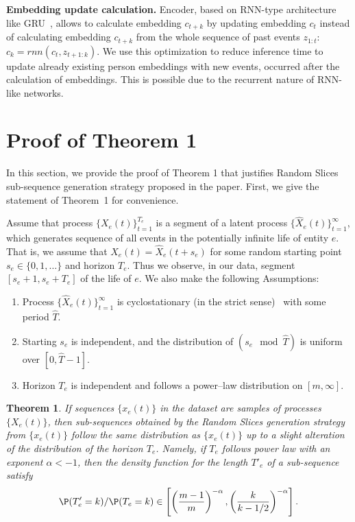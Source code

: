 \documentclass{article}
\newtheorem{thm}{Theorem}
\begin{document}
\textbf{Embedding update calculation.} Encoder, based on RNN-type architecture like GRU~\citep{Cho2014LearningPR}, allows to calculate embedding $c_{t+k}$ by updating embedding $c_t$ instead of  calculating embedding $c_{t+k}$ from the whole sequence of past events $z_{1:t}$: $c_k = rnn(c_t, z_{t+1:k})$. We use this optimization to reduce inference time to update already existing person embeddings with new events, occurred after the calculation of embeddings. This is possible due to the recurrent nature of RNN-like networks.

\section{Proof of Theorem 1} \label{app-sec-proof}

In this section, we provide the proof of Theorem 1 that justifies Random Slices sub-sequence generation strategy proposed in the paper. First, we give the statement of Theorem~1 for convenience.

Assume that process $\{X_e(t)\}_{t=1}^{T_e}$ is a segment of a latent process $\{\widehat{X}_e(t)\}_{t=1}^{\infty}$, which generates sequence of all events in the potentially infinite life of entity $e$. That is, we assume that $X_e(t)=\widehat{X}_e(t+s_e)$ for some random starting point $s_e\in \{0,1,\ldots\}$ and horizon $T_e$. Thus we observe, in our data, segment $[s_e+1,s_e+T_e]$ of the life of $e$. We also make the following Assumptions:
\begin{enumerate}
    \item Process $\{\widehat{X}_e(t)\}_{t=1}^{\infty}$ is cyclostationary (in the strict sense)~\citep{Gardner2006Cyclostationarity} with some period $\widehat{T}$.
    \item Starting $s_e$ is independent, and the distribution of $(s_e \mod \widehat{T})$ is uniform over $[0,\widehat{T}-1]$.
    \item Horizon $T_e$ is independent and follows a power--law distribution on $[m,\infty]$.
\end{enumerate}
\begin{thm}
If sequences $\{x_e(t)\}$ in the dataset are samples of processes $\{X_e(t)\}$, then sub-sequences obtained by the Random Slices generation strategy from $\{x_e(t)\}$ follow the same distribution as $\{x_e(t)\}$ up to a slight alteration of the distribution of the horizon $T_e$. Namely, if $T_e$ follows power law with an exponent $\alpha <-1$, then the density function for the length $T'_e$ of a sub-sequence satisfy 
\begin{equation}\label{probability_ratio}
\P(T'_e=k)/\P(T_e=k)\in \left [\left (\frac{m-1}{m}\right )^{-\alpha},\left (\frac{k}{k-1/2}\right )^{-\alpha}\right ].    
\end{equation}

\end{thm}
\end{document}
